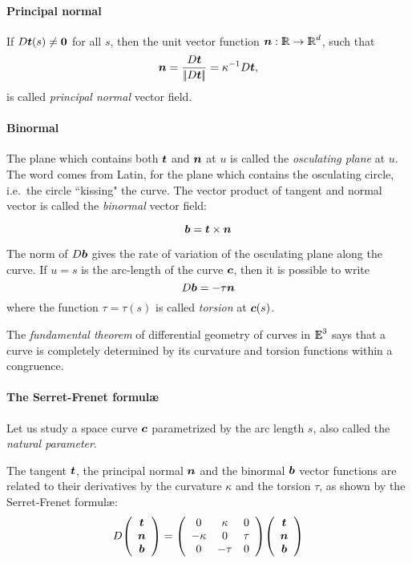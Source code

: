 \documentclass{31x47jw}
\begin{document}
\paragraph{Principal normal}

If $D{\mbox{\boldmath $t$}}(s)\not= {\mbox{\boldmath $0$}}$ for all $s$, then the unit vector function
${\mbox{\boldmath $n$}}:\mathbb{I\!\!R}\rightarrow\mathbb{I\!\!R}^{d}$, such that
\[
{\mbox{\boldmath $n$}} = {D{\mbox{\boldmath $t$}} \over {\left|\!\left|D{\mbox{\boldmath $t$}}\right|\!\right|}} = \kappa^{-1} {D{\mbox{\boldmath $t$}}} ,
\]
is called \emph{principal normal} vector field.

\paragraph{Binormal}

The plane which contains both ${\mbox{\boldmath $t$}}$ and ${\mbox{\boldmath $n$}}$ at $u$ is called the
\emph{osculating plane} at $u$. The word comes from Latin, for the plane 
which contains the osculating circle, i.e.~the circle
``kissing" the curve.  The vector product of tangent and
normal vector is called the \emph{binormal} vector field:

\[
{\mbox{\boldmath $b$}} = {\mbox{\boldmath $t$}} \times {\mbox{\boldmath $n$}}
\]

The norm of $D{\mbox{\boldmath $b$}}$ gives the rate of variation of the osculating 
plane along the curve. If $u=s$ is the arc-length of the
curve ${\mbox{\boldmath $c$}}$, then it is possible to write 
\[
D{\mbox{\boldmath $b$}} = -\tau {\mbox{\boldmath $n$}}
\]
where the function $\tau=\tau(s)$ is called \emph{torsion} at ${\mbox{\boldmath $c$}}(s)$.

The \emph{fundamental theorem} of differential geometry of curves in
$\mathbb{I\!\!E}^{3}$ says that a curve is completely determined by its curvature
and torsion functions within a congruence.

\paragraph{The Serret-Frenet formul\ae}

Let us study a space curve ${\mbox{\boldmath $c$}}$ parametrized by the arc
length $s$, also called the \emph{natural parameter}.

The tangent ${\mbox{\boldmath $t$}}$, the principal normal ${\mbox{\boldmath $n$}}$ and the binormal ${\mbox{\boldmath $b$}}$
vector functions  are related to their
derivatives by the curvature $\kappa$ and the torsion $\tau$, as shown by the
Serret-Frenet formul\ae:
\[
D{\left(\begin{array}{cccccccc}{\mbox{\boldmath $t$}}\\ {\mbox{\boldmath $n$}}\\ {\mbox{\boldmath $b$}}\end{array}\right)} =
{\left(\begin{array}{cccccccc}
0 & \kappa & 0 \\
-\kappa & 0 & \tau \\
0 & -\tau & 0
\end{array}\right)}
{\left(\begin{array}{cccccccc}{\mbox{\boldmath $t$}}\\ {\mbox{\boldmath $n$}}\\ {\mbox{\boldmath $b$}}\end{array}\right)}
\]
\end{document}
